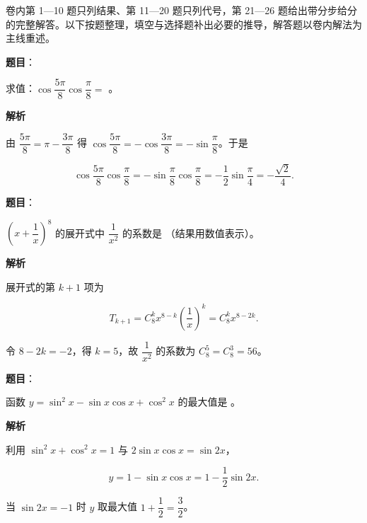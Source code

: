 

卷内第 1—10 题只列结果、第 11—20 题只列代号，第 21—26 题给出带分步给分的完整解答。以下按题整理，填空与选择题补出必要的推导，解答题以卷内解法为主线重述。


\begin{answer}

\textbf{题目}：

求值：$\cos\dfrac{5\pi}{8}\cos\dfrac{\pi}{8}=$ \gkblank{}。

\textbf{解析}

由 $\dfrac{5\pi}{8}=\pi-\dfrac{3\pi}{8}$ 得 $\cos\dfrac{5\pi}{8}=-\cos\dfrac{3\pi}{8}=-\sin\dfrac{\pi}{8}$。于是

\nopagebreak[4]
\[
\cos\frac{5\pi}{8}\cos\frac{\pi}{8}=-\sin\frac{\pi}{8}\cos\frac{\pi}{8}=-\frac{1}{2}\sin\frac{\pi}{4}=-\frac{\sqrt{2}}{4}.
\]


\end{answer}
\begin{answer}

\textbf{题目}：

$\left(x+\dfrac{1}{x}\right)^{8}$ 的展开式中 $\dfrac{1}{x^{2}}$ 的系数是 \gkblank{}（结果用数值表示）。

\textbf{解析}

展开式的第 $k+1$ 项为

\nopagebreak[4]
\[
T_{k+1}=C_{8}^{k}x^{8-k}\left(\frac{1}{x}\right)^{k}=C_{8}^{k}x^{8-2k}.
\]

令 $8-2k=-2$，得 $k=5$，故 $\dfrac{1}{x^{2}}$ 的系数为 $C_{8}^{5}=C_{8}^{3}=56$。


\end{answer}
\begin{answer}

\textbf{题目}：

函数 $y=\sin^{2}x-\sin x\cos x+\cos^{2}x$ 的最大值是 \gkblank{}。

\textbf{解析}

利用 $\sin^{2}x+\cos^{2}x=1$ 与 $2\sin x\cos x=\sin 2x$，

\nopagebreak[4]
\[
y=1-\sin x\cos x=1-\frac{1}{2}\sin 2x.
\]

当 $\sin 2x=-1$ 时 $y$ 取最大值 $1+\dfrac{1}{2}=\dfrac{3}{2}$。


\end{answer}
